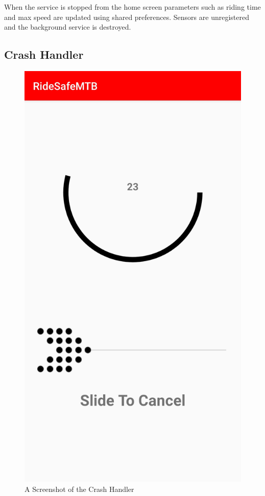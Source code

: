 When the service is stopped from the home screen parameters such as riding time and max speed are updated using shared preferences.  Sensors are unregistered and the background service is destroyed. 




\subsection{Crash Handler}



\begin{figure}
\begin{center}
\includegraphics[scale = 0.15] {implementation/crash.jpg}
\end{center}
\caption{A Screenshot of the Crash Handler}
\label{crash}
\end{figure}



